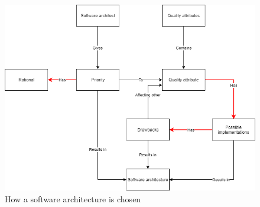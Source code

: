 \begin{figure}[H]
	\includegraphics[width=\linewidth]{creating_architecture.png}
	\caption{How a software architecture is chosen}
\end{figure}




